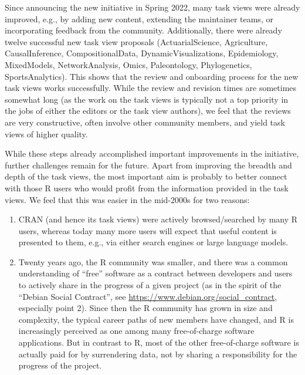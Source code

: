 Since announcing the new initiative in Spring 2022,
many task views were already improved, e.g., by adding new content, extending the maintainer
teams, or incorporating feedback from the community. Additionally, there were already twelve
successful new task view proposals (ActuarialScience, Agriculture, CausalInference, CompositionalData, DynamicVisualizations, Epidemiology, MixedModels, NetworkAnalysis, Omics, Paleontology, Phylogenetics, SportsAnalytics).
This shows that the review and onboarding process for the new task views works successfully.
While the review and revision times are sometimes somewhat long (as the work on the task views
is typically not a top priority in the jobs of either the editors or the task view authors),
we feel that the reviews are very constructive, often involve other community members, and
yield task views of higher quality.

While these steps already accomplished important improvements in the initiative,
further challenges remain for the future. Apart from improving the breadth and depth of
the task views, the most important aim is probably to better connect with those R users who
would profit from the information provided in the task views. We feel that this was easier
in the mid-2000s for two reasons:

\begin{enumerate}
\def\labelenumi{\arabic{enumi}.}
\item
  CRAN (and hence its task views) were actively browsed/searched by many R users, whereas
  today many more users will expect that useful content is presented to them, e.g., via
  either search engines or large language models.
\item
  Twenty years ago, the R community was smaller, and there
  was a common understanding of ``free'' software as a contract between developers and users to
  actively share in the progress of a given project (as in the spirit of the
  ``Debian Social Contract'', see \url{https://www.debian.org/social_contract}, especially point 2).
  Since then the R community has grown in size and complexity, the typical career
  paths of new members have changed, and R is increasingly perceived as one among many
  free-of-charge software applications. But in contrast to R, most of the other
  free-of-charge software is actually paid for by surrendering data, not by sharing
  a responsibility for the progress of the project.
\end{enumerate}

